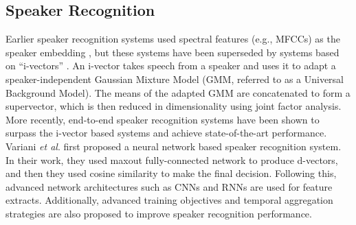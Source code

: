 \documentclass[a4paper]{article}
\newcommand{\etal}{\textit{et al}. }
\begin{document}
\subsection{Speaker Recognition}
Earlier speaker recognition systems used spectral features (e.g., MFCCs) as the speaker embedding \cite{martinez2012speaker, tiwari2010mfcc}, but these systems have been superseded by systems based on “i-vectors” \cite{dehak2010front, garcia2011analysis, kenny2010bayesian}. An i-vector takes speech from a speaker and uses it to adapt a speaker-independent Gaussian Mixture Model (GMM, referred to as a Universal Background Model). The means of the adapted GMM are concatenated to form a supervector, which is then reduced in dimensionality using joint factor analysis. More recently, end-to-end speaker recognition \cite{variani2014deep, wan2018generalized, xie2019utterance, sadjadi2016ibm, li2017deep} systems have been shown to surpass the i-vector based systems and achieve state-of-the-art performance. Variani \etal first proposed a neural network based speaker recognition system. In their work, they used maxout fully-connected network to produce d-vectors, and then they used cosine similarity to make the final decision. Following this, advanced network architectures such as CNNs \cite{xie2019utterance, li2017deep, cai2018exploring, hajibabaei2018unified, bhattacharya2019deep} and RNNs \cite{li2017deep, wan2018generalized} are used for feature extracts. Additionally, advanced training objectives \cite{wan2018generalized, hajibabaei2018unified, bhattacharya2019deep} and temporal aggregation strategies \cite{gao2019improving, xie2019utterance, cai2018exploring, li2017deep} are also proposed to improve speaker recognition performance.
\end{document}
